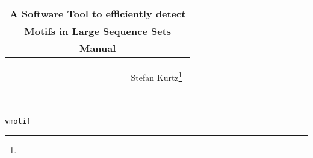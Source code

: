 \documentclass[12pt]{article}
\author{Stefan Kurtz\thanks{\SKaffiliation}}
\title{\begin{tabular}{c}
\textbf{A Software Tool to efficiently detect}\\
\textbf{Motifs in Large Sequence Sets}\\
\textbf{Manual}
\end{tabular}}
\newcommand{\Programname}[1]{\texttt{#1}}
\newcommand{\VMOT}{\Programname{vmotif}\xspace}
\begin{document}
\maketitle

\begin{Showprogramwithoptions}{\VMOT}{}



\end{Showprogramwithoptions}
\end{document}
